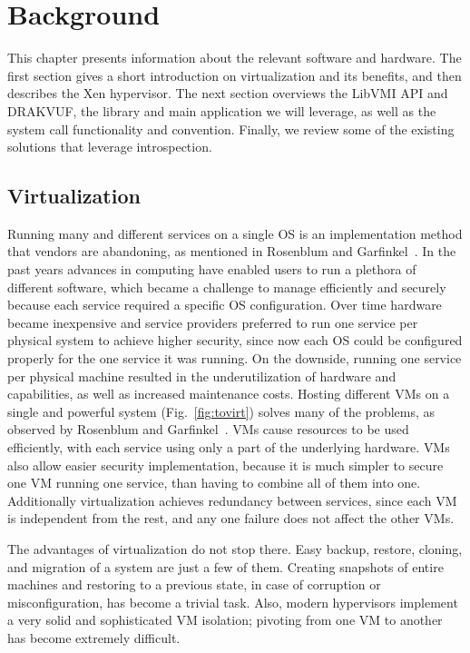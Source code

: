 \acresetall
\chapter{Background}\label{ch:background}

This chapter presents information about the relevant software and hardware. The first section gives a short introduction on virtualization and its benefits, and then describes the Xen hypervisor. The next section overviews the LibVMI \ac{API} and DRAKVUF, the library and main application we will leverage, as well as the system call functionality and convention. Finally, we review some of the existing solutions that leverage introspection.

\section{Virtualization}\label{sec:virtualization}
Running many and different services on a single \ac{OS} is an implementation method that vendors are abandoning, as mentioned in Rosenblum and Garfinkel~\cite{rosenblum2005virtual}. In the past years advances in computing have enabled users to run a plethora of different software, which became a challenge to manage efficiently and securely because each service required a specific \ac{OS} configuration. Over time hardware became inexpensive and service providers preferred to run one service per physical system to achieve higher security, since now each \ac{OS} could be configured properly for the one service it was running. On the downside, running one service per physical machine resulted in the underutilization of hardware and capabilities, as well as increased maintenance costs. Hosting different \ac{VM}s on a single and powerful system (Fig.~\ref{fig:tovirt}) solves many of the problems, as observed by Rosenblum and Garfinkel~\cite{rosenblum2005virtual}. \ac{VM}s cause resources to be used efficiently, with each service using only a part of the underlying hardware. \acp{VM} also allow easier security implementation, because it is much simpler to secure one \ac{VM} running one service, than having to combine all of them into one. Additionally virtualization achieves redundancy between services, since each \ac{VM} is independent from the rest, and any one failure does not affect the other \ac{VM}s.

\par The advantages of virtualization do not stop there. Easy backup, restore, cloning, and migration of a system are just a few of them. Creating snapshots of entire machines and restoring to a previous state, in case of corruption or misconfiguration, has become a trivial task. Also, modern hypervisors implement a very solid and sophisticated \ac{VM} isolation; pivoting from one \ac{VM} to another has become extremely difficult.

